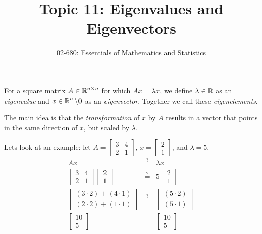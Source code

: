 


\title{Topic 11: Eigenvalues and Eigenvectors}
\author{02-680: Essentials of Mathematics and Statistics}


\maketitle

For a square matrix $A\in\operatorname{\mathbb{R}}^{n\times n}$ for which $Ax=\lambda x$, 
we define $\lambda\in\operatorname{\mathbb{R}}$ as an \emph{eigenvalue} and $x\in\operatorname{\mathbb{R}}^{n}\setminus\mathbf{0}$ as an \emph{eigenvector}. 
Together we call these \emph{eigenelements}. 

The main idea is that the \emph{transformation} of $x$ by $A$ results in a vector that points in the same direction of $x$, but scaled by $\lambda$. 

Lets look at an example: let $A=\begin{bmatrix}3 & 4 \\ 2 & 1\end{bmatrix}$, $x=\begin{bmatrix}2\\1\end{bmatrix}$, and $\lambda=5$.
\[\begin{array}{rcl}
Ax&  \stackrel{?}{=}  &\lambda x\\
\begin{bmatrix}3 & 4 \\ 2 & 1\end{bmatrix}\begin{bmatrix}2\\1\end{bmatrix} &  \stackrel{?}{=}  & 5\begin{bmatrix}2\\1\end{bmatrix}\\
\begin{bmatrix}(3\cdot2)+(4\cdot1)\\(2\cdot2)+(1\cdot1)\end{bmatrix} &  \stackrel{?}{=}  & \begin{bmatrix}(5\cdot2)\\(5\cdot1)\end{bmatrix}\\
\begin{bmatrix}10\\5\end{bmatrix} & = & \begin{bmatrix}10\\5\end{bmatrix}\\
\end{array}\]

